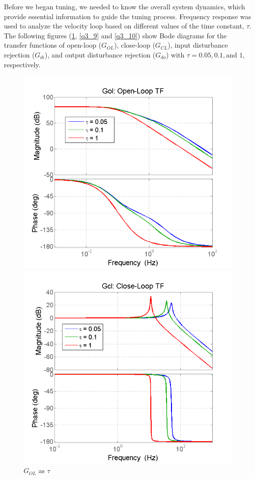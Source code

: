 \documentclass[letterpaper]{article}
\begin{document}
Before we began tuning, we needed to know the overall system dynamics, which provide essential information to guide the tuning process. Frequency response was used to analyze the velocity loop based on different values of the time constant, $\tau$. The following figures (\ref{q3_8}, \ref{q3_9} and \ref{q3_10}) show Bode diagrams for the transfer functions of open-loop ($G_{OL}$), close-loop ($G_{CL}$), input disturbance rejection ($G_{di}$), and output disturbance rejection ($G_{do}$) with $\tau = 0.05, 0.1, \text{and } 1$, respectively.
\begin{figure}[H]
\begin{center}
\includegraphics[scale=0.4]{q3_8}
\caption{$G_{OL}$ as $\tau$}
\label{q3_8}
\includegraphics[scale=0.4]{q3_9}

\end{center}
\end{figure}
\end{document}
